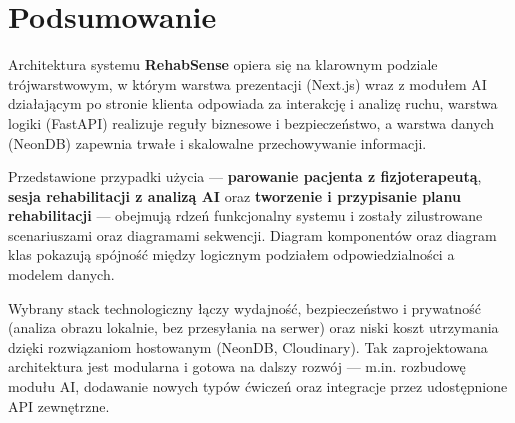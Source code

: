 \documentclass[11pt,a4paper]{article}
\newcommand{\sysname}{\textbf{RehabSense}}
\begin{document}
\section{Podsumowanie}
Architektura systemu \sysname{} opiera się na klarownym podziale trójwarstwowym, w którym warstwa prezentacji (Next.js) wraz z modułem AI działającym po stronie klienta odpowiada za interakcję i analizę ruchu, warstwa logiki (FastAPI) realizuje reguły biznesowe i bezpieczeństwo, a warstwa danych (NeonDB) zapewnia trwałe i skalowalne przechowywanie informacji.

Przedstawione przypadki użycia — \textbf{parowanie pacjenta z fizjoterapeutą}, \textbf{sesja rehabilitacji z analizą AI} oraz \textbf{tworzenie i przypisanie planu rehabilitacji} — obejmują rdzeń funkcjonalny systemu i zostały zilustrowane scenariuszami oraz diagramami sekwencji. Diagram komponentów oraz diagram klas pokazują spójność między logicznym podziałem odpowiedzialności a modelem danych.

Wybrany stack technologiczny łączy wydajność, bezpieczeństwo i prywatność (analiza obrazu lokalnie, bez przesyłania na serwer) oraz niski koszt utrzymania dzięki rozwiązaniom hostowanym (NeonDB, Cloudinary). Tak zaprojektowana architektura jest modularna i gotowa na dalszy rozwój — m.in. rozbudowę modułu AI, dodawanie nowych typów ćwiczeń oraz integracje przez udostępnione API zewnętrzne.
\end{document}
